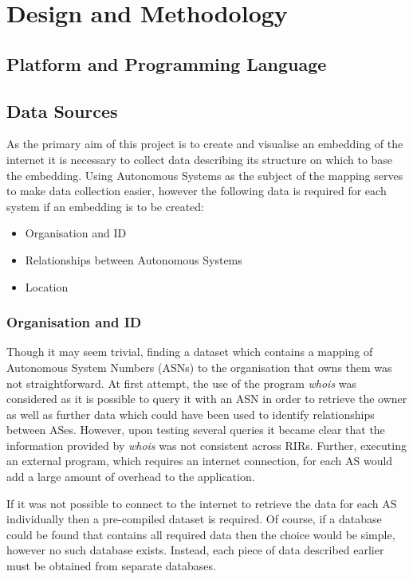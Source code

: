 \chapter{Design and Methodology}
\label{cha:Design}

\section{Platform and Programming Language}
\label{sec:DesignLanguage}

\section{Data Sources}
\label{sec:DesignDataSources}
As the primary aim of this project is to create and visualise an embedding of the internet it is necessary to collect data describing its structure on which to base the embedding. Using Autonomous Systems as the subject of the mapping serves to make data collection easier, however the following data is required for each system if an embedding is to be created:

\begin{itemize}
	\item{Organisation and ID}
	\item{Relationships between Autonomous Systems}
	\item{Location}
\end{itemize}

\subsection{Organisation and ID}
Though it may seem trivial, finding a dataset which contains a mapping of Autonomous System Numbers (ASNs) to the organisation that owns them was not straightforward. At first attempt, the use of the program \textit{whois} was considered as it is possible to query it with an ASN in order to retrieve the owner as well as further data which could have been used to identify relationships between ASes. However, upon testing several queries it became clear that the information provided by \textit{whois} was not consistent across RIRs. Further, executing an external program, which requires an internet connection, for each AS would add a large amount of overhead to the application. 

If it was not possible to connect to the internet to retrieve the data for each AS individually then a pre-compiled dataset is required. Of course, if a database could be found that contains all required data then the choice would be simple, however no such database exists. Instead, each piece of data described earlier must be obtained from separate databases. 

